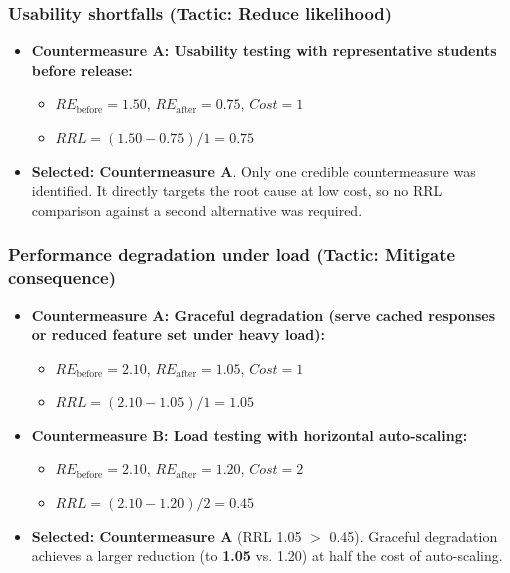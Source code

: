 \documentclass[11pt]{article}
\begin{document}
\subsubsection*{Usability shortfalls (Tactic: Reduce likelihood)}
\begin{itemize}[leftmargin=1.5em]
  \item \textbf{Countermeasure A: Usability testing with representative students before release:}
  \begin{itemize}[leftmargin=1.5em]
    \item $RE_{\text{before}} = 1.50$, $RE_{\text{after}} = 0.75$, $Cost = 1$
    \item $RRL = (1.50 - 0.75) / 1 = 0.75$
  \end{itemize}
  \item \textbf{Selected: Countermeasure A}. Only one credible countermeasure was identified. It directly targets the root cause at low cost, so no RRL comparison against a second alternative was required.
\end{itemize}

\subsubsection*{Performance degradation under load (Tactic: Mitigate consequence)}
\begin{itemize}[leftmargin=1.5em]
  \item \textbf{Countermeasure A: Graceful degradation (serve cached responses or reduced feature set under heavy load):}
  \begin{itemize}[leftmargin=1.5em]
    \item $RE_{\text{before}} = 2.10$, $RE_{\text{after}} = 1.05$, $Cost = 1$
    \item $RRL = (2.10 - 1.05) / 1 = 1.05$
  \end{itemize}
  \item \textbf{Countermeasure B: Load testing with horizontal auto-scaling:}
  \begin{itemize}[leftmargin=1.5em]
    \item $RE_{\text{before}} = 2.10$, $RE_{\text{after}} = 1.20$, $Cost = 2$
    \item $RRL = (2.10 - 1.20) / 2 = 0.45$
  \end{itemize}
  \item \textbf{Selected: Countermeasure A} (RRL 1.05 $>$ 0.45). Graceful degradation achieves a larger reduction (to \textbf{1.05} vs. 1.20) at half the cost of auto-scaling.
\end{itemize}
\end{document}

